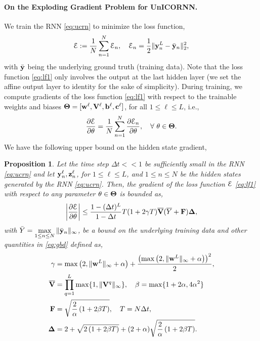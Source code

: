 \documentclass{article}
\newtheorem{proposition}[theorem]{Proposition}
\newcommand{\by}{{\bf y}}
\newcommand{\bz}{{\bf z}}
\newcommand{\bw}{{\bf w}}
\newcommand{\bb}{{\bf b}}
\newcommand{\bV}{{\bf V}}
\newcommand{\bc}{{\bf c}}
\newcommand{\Dt}{{\Delta t}}
\newcommand{\E}{\EuScript{E}}
\begin{document}
\paragraph{On the Exploding Gradient Problem for UnICORNN.} We train the RNN \eqref{eq:ucrn} to minimize the loss function,
\begin{equation}
\label{eq:lf1}
\E := \frac{1}{N}\sum\limits_{n=1}^N \E_n, \quad \E_n = \frac{1}{2} \|\by^L_n - \bar{\by}_n\|_2^2,
\end{equation}
with $\bar{\by}$ being the underlying ground truth (training data). Note that the loss function \eqref{eq:lf1} only involves the output at the last hidden layer (we set the affine output layer to identity for the sake of simplicity). During training, we compute gradients of the loss function \eqref{eq:lf1} with respect to the trainable weights and biases $\bf \Theta = [\bw^\ell,\bV^{\ell}, \bb^\ell,\bc^\ell]$, for all $1 \leq \ell \leq L$, i.e.,
\begin{equation}
\label{eq:grad1}
\frac{\partial \E}{\partial \theta} = \frac{1}{N}\sum_{n=1}^N \frac{\partial \E_n}{\partial \theta}, \quad \forall ~\theta \in {\bf \Theta}.
\end{equation} 
We have the following upper bound on the hidden state gradient,
\begin{proposition}
\label{prop:3}
Let the time step $\Dt << 1$ be sufficiently small in the RNN \eqref{eq:ucrn} and let $\by^\ell_n,\bz^\ell_n$, for $1 \leq \ell \leq L$, and $1 \leq n \leq N$ be the hidden states generated by the RNN \eqref{eq:ucrn}. Then, the gradient of the loss function $\E$ \eqref{eq:lf1} with respect to any parameter $\theta \in {\bf \Theta}$ is bounded as,
\begin{equation}
    \label{eq:gbd}
    \left|\frac{\partial \E}{\partial \theta}\right| \leq \frac{1-(\Dt)^L}{1-\Dt}T (1+2\gamma T) \overline{\bV}(\overline{Y} + {\bf F}){\bf \Delta},
\end{equation}
with $\bar{Y} = \max\limits_{1 \leq n \leq N} \|\bar{\by}_n\|_{\infty}$, be a bound on the underlying training data and other quantities in \eqref{eq:gbd} defined as,
\begin{equation*}
\begin{aligned}
\gamma &= \max\left(2,\|\bw^{L}\|_{\infty}+\alpha\right) + \frac{\left(\max\left(2,\|\bw^{L}\|_{\infty}+\alpha\right)\right)^2}{2}, \\
    \overline{\bV} &= \prod\limits_{q=1}^L \max\{1, \|\bV^q\|_{\infty}\}, \quad \beta=\max\{1+2\alpha,4\alpha^2\}\\
    {\bf F} &= \sqrt{\frac{2}{\alpha}\left(1+2\beta T\right)}, \quad T = N\Dt, \\
    {\bf \Delta} &= 2 + \sqrt{2\left(1+2\beta T\right)} + (2+\alpha) \sqrt{\frac{2}{\alpha}\left(1+2\beta T\right)}.
    \end{aligned}
\end{equation*}
\end{proposition}
\end{document}
